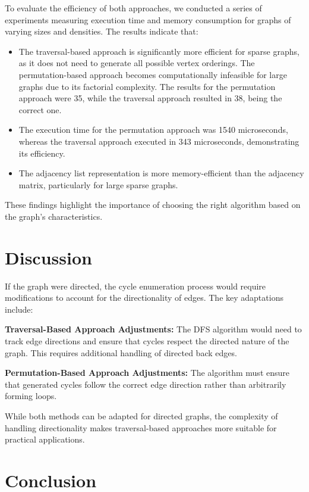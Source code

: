\documentclass{sbc2023}%
\begin{document}
To evaluate the efficiency of both approaches, we conducted a series of experiments measuring execution time and memory consumption for graphs of varying sizes and densities. The results indicate that:
\begin{itemize}
    \item The traversal-based approach is significantly more efficient for sparse graphs, as it does not need to generate all possible vertex orderings.
    The permutation-based approach becomes computationally infeasible for large graphs due to its factorial complexity. The results for the permutation approach were 35, while the traversal approach resulted in 38, being the correct one.
    \item The execution time for the permutation approach was 1540 microseconds, whereas the traversal approach executed in 343 microseconds, demonstrating its efficiency.
    \item The adjacency list representation is more memory-efficient than the adjacency matrix, particularly for large sparse graphs.
\end{itemize}

These findings highlight the importance of choosing the right algorithm based on the graph’s characteristics.
\section{Discussion}

If the graph were directed, the cycle enumeration process would require modifications to account for the directionality of edges. The key adaptations include:

\textbf{Traversal-Based Approach Adjustments:} The DFS algorithm would need to track edge directions and ensure that cycles respect the directed nature of the graph. This requires additional handling of directed back edges.

\textbf{Permutation-Based Approach Adjustments:} The algorithm must ensure that generated cycles follow the correct edge direction rather than arbitrarily forming loops.

While both methods can be adapted for directed graphs, the complexity of handling directionality makes traversal-based approaches more suitable for practical applications.

\section{Conclusion}
\end{document}

